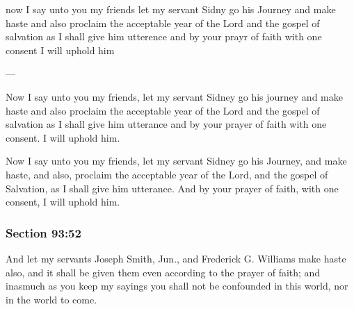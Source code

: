 		\begin{framed}
		\scriptsize
			\begin{compactdesc}
				\item[JSP] now I say unto you my friends let my servant Sidny go his Journey and make haste and also proclaim the acceptable year of the Lord and the gospel of salvation as I shall give him utterence and by your prayr of faith with one consent I will uphold him
				\item[BC] ---
				\item[RB2] Now I say unto you my friends, let my servant Sidney go his journey and make haste and also proclaim the acceptable year of the Lord and the gospel of salvation as I shall give him utterance and by your prayer of faith with one consent. I will uphold him. 
				\item[RB1] Now I say unto you my friends, let my servant Sidney go his Journey, and make haste, and also, proclaim the acceptable year of the Lord, and the gospel of Salvation, as I shall give him utterance. And by your prayer of faith, with one consent, I will uphold him. 
			\end{compactdesc}
		\end{framed}

	\subsubsection{Section 93:52} %
		\label{DC93-52}

		And let my servants Joseph Smith, Jun., and Frederick G. Williams make haste also, and it shall be given them even according to the prayer of faith; and inasmuch as you keep my sayings you shall not be confounded in this world, nor in the world to come.

